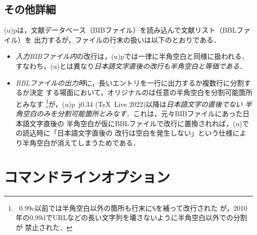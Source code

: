 \documentclass[a4paper,11pt,nomag,dvipdfmx]{jsarticle}
\def\code#1{\texttt{#1}}
\def\pBibTeX{p\kern-.05em\BibTeX}
\def\upBibTeX{u\pBibTeX}
\def\pBibTeX{p\BibTeX}%
\def\upBibTeX{u\pBibTeX}%
\begin{document}
\subsection{その他詳細}\label{sec:jnewline}

(u)\pBibTeX は，文献データベース（BIBファイル）を読み込んで文献リスト（BBLファイル）を
出力するが，ファイルの行末の扱いは以下のとおりである．%
\begin{itemize}
 \item \emph{入力BIBファイル内}の改行は，(u)\pBibTeX では一律に半角空白と同様に扱われる．
   すなわち，(u)\pTeX とは異なり\emph{日本語文字直後の改行も半角空白と等価である}．
 \item \emph{BBLファイルの出力時}に，長いエントリを一行に出力するか複数行に分割するか決定
   する場面において，オリジナルの\BibTeX は任意の半角空白を分割可能箇所とみなす
   \footnote{\BibTeX~0.99c以前では半角空白以外の箇所も行末に\code{\%}を補って改行された
   が，2010年の0.99dでURLなどの長い文字列を壊さないように半角空白以外での分割が
   禁止された．}が，(u)\pBibTeX~j0.34 (\TeX~Live 2022)以降は\emph{日本語文字の直後でない
   半角空白のみを分割可能箇所とみなす}．これは，元々BIBファイルにあった日本語文字直後の
   半角空白が仮にBBLファイルで改行に置換されれば，(u)\pTeX での読込時に「日本語文字直後の
   改行は空白を発生しない」という仕様により半角空白が消えてしまうためである\cite{tjb132}．
\end{itemize}


\section{コマンドラインオプション}\label{sec:commandline_option}
\end{document}
